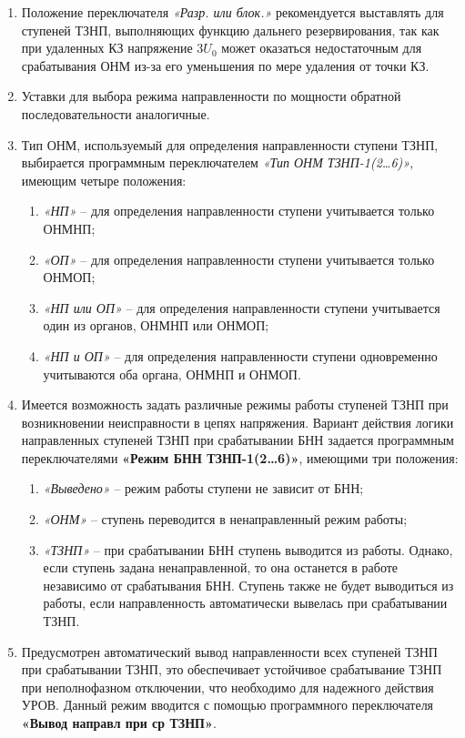 \begin{enumerate}
\item
Положение переключателя \textit{«Разр. или блок.»} рекомендуется выставлять для ступеней ТЗНП, выполняющих функцию дальнего резервирования, так как при удаленных КЗ напряжение $3U_0$ может оказаться недостаточным для срабатывания ОНМ из-за его уменьшения по мере удаления от точки КЗ.

\item
Уставки для выбора режима направленности по мощности обратной последовательности аналогичные.

\item
Тип ОНМ, используемый для определения направленности ступени ТЗНП, выбирается программным переключателем \textit{«Тип ОНМ ТЗНП-1(2…6)»}, имеющим четыре положения:
\begin{enumerate}[label=\arabic*)]
    \item \textit{«НП»} -- для определения направленности ступени учитывается только ОНМНП;
    \item \textit{«ОП»} -- для определения направленности ступени учитывается только ОНМОП;
    \item \textit{«НП или ОП»} -- для определения направленности ступени учитывается один из органов, ОНМНП или ОНМОП;
    \item \textit{«НП и ОП»} -- для определения направленности ступени одновременно учитываются оба органа, ОНМНП и ОНМОП.
\end{enumerate}

\item
Имеется возможность задать различные режимы работы ступеней ТЗНП при возникновении неисправности в цепях напряжения. Вариант действия логики направленных ступеней ТЗНП при срабатывании БНН задается программным переключателями \textbf{«Режим БНН ТЗНП-1(2…6)»}, имеющими три положения:
\begin{enumerate}[label=\arabic*)]
    \item \textit{«Выведено»} -- режим работы ступени не зависит от БНН;
    \item \textit{«ОНМ»} -- ступень переводится в ненаправленный режим работы;
    \item \textit{«ТЗНП»} -- при срабатывании БНН ступень выводится из работы. Однако, если ступень задана ненаправленной, то она останется в работе независимо от срабатывания БНН. Ступень также не будет выводиться из работы, если направленность автоматически вывелась при срабатывании ТЗНП.
\end{enumerate}

\item
Предусмотрен автоматический вывод направленности всех ступеней ТЗНП при срабатывании ТЗНП, это обеспечивает устойчивое срабатывание ТЗНП при неполнофазном отключении, что необходимо для надежного действия УРОВ. Данный режим вводится с помощью программного переключателя \textbf{«Вывод направл при ср ТЗНП»}.


\end{enumerate}
